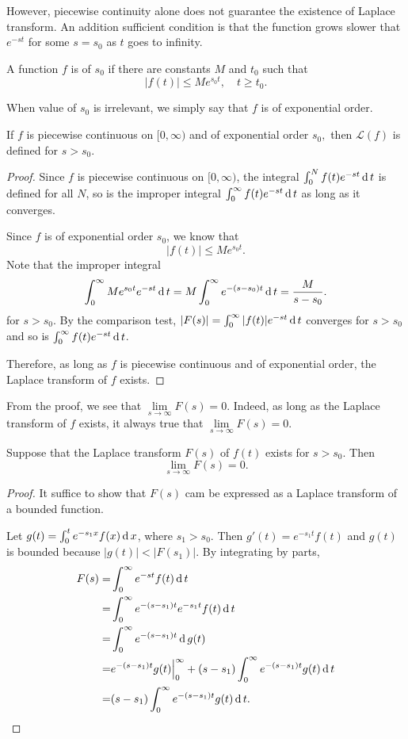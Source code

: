 However, piecewise continuity alone does not guarantee the existence of Laplace transform. An addition sufficient condition is that the function grows slower that $e^{-st}$ for some $s=s_0$ as $t$ goes to infinity.

\begin{definition}
  A function $f$ is of  $s_0$ if there are constants $M$ and $t_0$ such that
\[|f(t)|\le Me^{s_0t},\quad t\ge t_0.\]
\end{definition}

When value of $s_0$ is irrelevant, we simply say that $f$ is of exponential order.

\begin{theorem}
  If $f$ is piecewise continuous on $[0,\infty)$ and of exponential order $s_0,$ then $\mathcal{L}(f)$ is defined for $s>s_0$.
\end{theorem}
\begin{proof}
  Since $f$ is piecewise continuous on $[0, \infty)$, the integral $\int_0^Nf(t)e^{-st}\operatorname{d} t$ is defined for all $N$, so is the improper integral $\int_0^\infty f(t)e^{-st}\operatorname{d} t$ as long as it converges.

  Since $f$ is of exponential order $s_0$, we know that
  \[|f(t)|\le Me^{s_0t}.\]
  Note that the improper integral
  \[\int_0^\infty Me^{s_0t}e^{-st}\operatorname{d} t=M\int_0^\infty e^{-(s-s_0)t}\operatorname{d} t=\frac{M}{s-s_0}.\]
for $s>s_0$.
  By the comparison test, $|F(s)|=\int_0^\infty |f(t)|e^{-st}\operatorname{d} t$ converges for $s>s_0$ and so is $\int_0^\infty f(t)e^{-st}\operatorname{d} t$. 
 
  Therefore, as long as $f$ is piecewise continuous and of exponential order, the Laplace transform of $f$ exists.
\end{proof}

From the proof, we see that $\lim\limits_{s\to \infty}F(s)=0$. Indeed, as long as the Laplace transform of $f$ exists, it always true that $\lim\limits_{s\to \infty}F(s)=0$.
\begin{corollary}
  Suppose that the Laplace transform $F(s)$ of $f(t)$ exists for $s>s_0$. Then 
  \[\lim\limits_{s\to \infty}F(s)=0.\]
\end{corollary}
\begin{proof}
  It suffice to show that $F(s)$ cam be expressed as a Laplace transform of a bounded function. 

  Let $g(t)=\int_{0}^{t}e^{-s_{1}x}f(x)\operatorname{d} x$, where $s_1>s_0$. Then $g'(t)= e^{-s_{1}t}f(t)$ and $g(t)$ is bounded because $|g(t)|<|F(s_1)|$.
  By integrating by parts,
\[
  \begin{aligned}
    F(s)=&\int_{0}^{\infty}e^{-st}f(t)\operatorname{d} t\\
    =&\int_{0}^{\infty}e^{-(s-s_1)t}e^{-s_{1}t}f(t)\operatorname{d} t\\
    =&\int_{0}^{\infty}e^{-(s-s_1)t}\operatorname{d} g(t)\\
    =&e^{-(s-s_1)t}g(t)\Big|_0^\infty+(s-s_1)\int_{0}^{\infty}e^{-(s-s_1)t}g(t)\operatorname{d} t\\
    =&(s-s_{1})\int_{0}^{\infty }e^{-(s-s_{1})t}g(t)\operatorname{d} t.
  \end{aligned}
\]
\end{proof}

